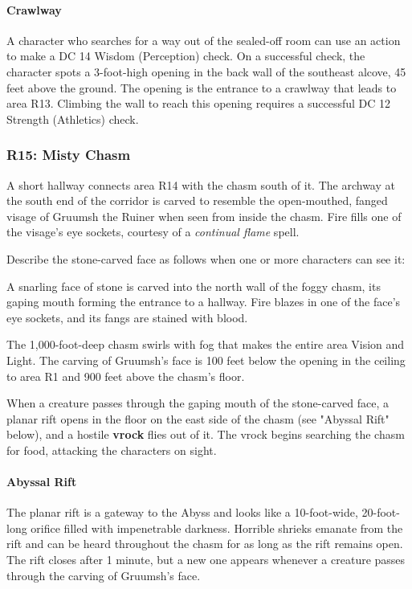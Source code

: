 \documentclass[a4paper, 11pt, bg=full, twocolumn, nooutline]{dndbook}
\begin{document}
\paragraph{Crawlway}

A character who searches for a way out of the sealed-off room can use an action to make a DC 14 Wisdom (Perception) check. On a successful check, the character spots a 3-foot-high opening in the back wall of the southeast alcove, 45 feet above the ground. The opening is the entrance to a crawlway that leads to area R13. Climbing the wall to reach this opening requires a successful DC 12 Strength (Athletics) check.

\subsubsection{R15: Misty Chasm}

A short hallway connects area R14 with the chasm south of it. The archway at the south end of the corridor is carved to resemble the open-mouthed, fanged visage of Gruumsh the Ruiner when seen from inside the chasm. Fire fills one of the visage's eye sockets, courtesy of a \textit{continual flame} spell.

Describe the stone-carved face as follows when one or more characters can see it:

\begin{DndReadAloud}
A snarling face of stone is carved into the north wall of the foggy chasm, its gaping mouth forming the entrance to a hallway. Fire blazes in one of the face's eye sockets, and its fangs are stained with blood.
\end{DndReadAloud}

The 1,000-foot-deep chasm swirls with fog that makes the entire area Vision and Light. The carving of Gruumsh's face is 100 feet below the opening in the ceiling to area R1 and 900 feet above the chasm's floor.

When a creature passes through the gaping mouth of the stone-carved face, a planar rift opens in the floor on the east side of the chasm (see "Abyssal Rift" below), and a hostile \textbf{vrock} flies out of it. The vrock begins searching the chasm for food, attacking the characters on sight.

\paragraph{Abyssal Rift}

The planar rift is a gateway to the Abyss and looks like a 10-foot-wide, 20-foot-long orifice filled with impenetrable darkness. Horrible shrieks emanate from the rift and can be heard throughout the chasm for as long as the rift remains open. The rift closes after 1 minute, but a new one appears whenever a creature passes through the carving of Gruumsh's face.
\end{document}
